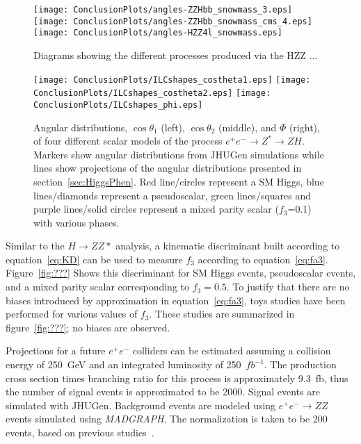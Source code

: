 \begin{figure}
\begin{center}
\texttt{[image: ConclusionPlots/angles-ZZHbb\_snowmass\_3.eps]}
\texttt{[image: ConclusionPlots/angles-ZZHbb\_snowmass\_cms\_4.eps]}
\texttt{[image: ConclusionPlots/angles-HZZ4l\_snowmass.eps]}
\label{fig:HZZprocesses}
\caption{Diagrams showing the different processes produced
via the HZZ ... }
\end{center}
\end{figure}

\begin{figure}
\begin{center}
\texttt{[image: ConclusionPlots/ILCshapes\_costheta1.eps]}
\texttt{[image: ConclusionPlots/ILCshapes\_costheta2.eps]}
\texttt{[image: ConclusionPlots/ILCshapes\_phi.eps]}
\label{fig:ILCprojections}
\caption{Angular distributions, $\cos\theta_1$ (left), 
$\cos\theta_2$ (middle), and $\Phi$ (right), of four different 
scalar models of the process $e^+e^-\to Z^*\to ZH$.  Markers
show angular distributions from JHUGen simulations while
lines show projections of the angular distributions presented
in section~\ref{sec:HiggsPhen}. Red line/circles represent a 
SM Higgs, blue lines/diamonds represent a pseudoscalar, green
lines/squares and purple lines/solid circles represent a 
mixed parity scalar ($f_3$=0.1) with various phases.}
\end{center}
\end{figure}

Similar to the $H\to ZZ*$ 
analysis, a kinematic discriminant built according to
equation~\ref{eq:KD} can be used to measure 
$f_3$ according to equation~\ref{eq:fa3}.  
Figure~\ref{fig:???} Shows this discriminant for SM Higgs
events, pseudoscalar events, and a mixed parity scalar
corresponding to $f_3=0.5$.  To justify that there are no
biases introduced by approximation in equation~\ref{eq:fa3},
toys studies have been performed for various values of 
$f_3$.  These studies are summarized in figure~\ref{fig:???};
no biases are observed.  

Projections for a future $e^+e^-$
colliders can be estimated assuming a collision energy  
of 250~GeV and an integrated luminosity of 250~$fb^{-1}$.
The production cross section times branching ratio for 
this process is approximately 9.3~fb, thus the number 
of signal events is approximated to be 2000.  Signal 
events are simulated with JHUGen.  Background events
are modeled using $e^+e^-\to ZZ$ events simulated using
{\it MADGRAPH}.  The normalization is taken to be 200 
events, based on previous studies~\cite{??}.  


